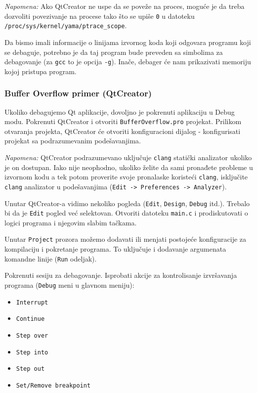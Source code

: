 \emph{Napomena:} Ako QtCreator ne uspe da se poveže na proces, moguće je da treba dozvoliti povezivanje na procese tako što se upiše \texttt{0} u datoteku \texttt{/proc/sys/kernel/yama/ptrace\_scope}.

Da bismo imali informacije o linijama izvornog koda koji odgovara programu koji se debaguje, potrebno je da taj program bude preveden sa simbolima za debagovanje (za \texttt{gcc} to je opcija \texttt{-g}). Inače, debager će nam prikazivati memoriju kojoj pristupa program.

\subsubsection{Buffer Overflow primer (QtCreator)}\label{buffer-overflow-primer-qtcreator}

Ukoliko debagujemo Qt aplikacije, dovoljno je pokrenuti aplikaciju u Debug modu. Pokrenuti QtCreator i otvoriti \texttt{BufferOverflow.pro} projekat. Prilikom otvaranja projekta, QtCreator će otvoriti konfiguracioni dijalog - konfigurisati projekat sa podrazumevanim podešavanjima.

\emph{Napomena:} QtCreator podrazumevano uključuje \texttt{clang} statički analizator ukoliko je on dostupan. Iako nije neophodno, ukoliko želite da sami pronađete probleme u izvornom kodu a tek potom proverite svoje pronalaske koristeći \texttt{clang}, isključite \texttt{clang} analizator u podešavanjima (\texttt{Edit\ -\textgreater{}\ Preferences\ -\textgreater{}\ Analyzer}).

Unutar QtCreator-a vidimo nekoliko pogleda (\texttt{Edit}, \texttt{Design}, \texttt{Debug} itd.). Trebalo bi da je \texttt{Edit} pogled već selektovan. Otvoriti datoteku \texttt{main.c} i prodiskutovati o logici programa i njegovim slabim tačkama.

Unutar \texttt{Project} prozora možemo dodavati ili menjati postojeće konfiguracije za kompilaciju i pokretanje programa. To uključuje i dodavanje argumenata komandne linije (\texttt{Run} odeljak).

Pokrenuti sesiju za debagovanje. Isprobati akcije za kontrolisanje izvršavanja programa (\texttt{Debug} meni u glavnom meniju):

\begin{itemize}
\tightlist
\item
  \texttt{Interrupt}
\item
  \texttt{Continue}
\item
  \texttt{Step\ over}
\item
  \texttt{Step\ into}
\item
  \texttt{Step\ out}
\item
  \texttt{Set/Remove\ breakpoint}
\end{itemize}
